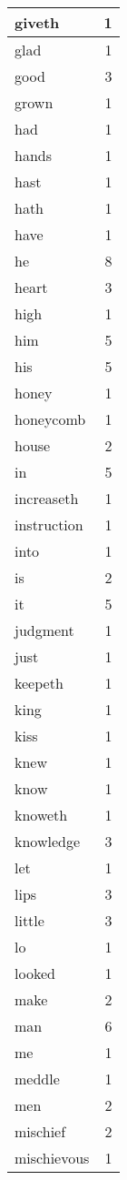 \begin{center}
\begin{longtable}{l|r}
giveth & 1\\ \hline 
glad & 1\\ \hline 
good & 3\\ \hline 
grown & 1\\ \hline 
had & 1\\ \hline 
hands & 1\\ \hline 
hast & 1\\ \hline 
hath & 1\\ \hline 
have & 1\\ \hline 
he & 8\\ \hline 
heart & 3\\ \hline 
high & 1\\ \hline 
him & 5\\ \hline 
his & 5\\ \hline 
honey & 1\\ \hline 
honeycomb & 1\\ \hline 
house & 2\\ \hline 
in & 5\\ \hline 
increaseth & 1\\ \hline 
instruction & 1\\ \hline 
into & 1\\ \hline 
is & 2\\ \hline 
it & 5\\ \hline 
judgment & 1\\ \hline 
just & 1\\ \hline 
keepeth & 1\\ \hline 
king & 1\\ \hline 
kiss & 1\\ \hline 
knew & 1\\ \hline 
know & 1\\ \hline 
knoweth & 1\\ \hline 
knowledge & 3\\ \hline 
let & 1\\ \hline 
lips & 3\\ \hline 
little & 3\\ \hline 
lo & 1\\ \hline 
looked & 1\\ \hline 
make & 2\\ \hline 
man & 6\\ \hline 
me & 1\\ \hline 
meddle & 1\\ \hline 
men & 2\\ \hline 
mischief & 2\\ \hline 
mischievous & 1\\ \hline 

\end{longtable}
\end{center}
